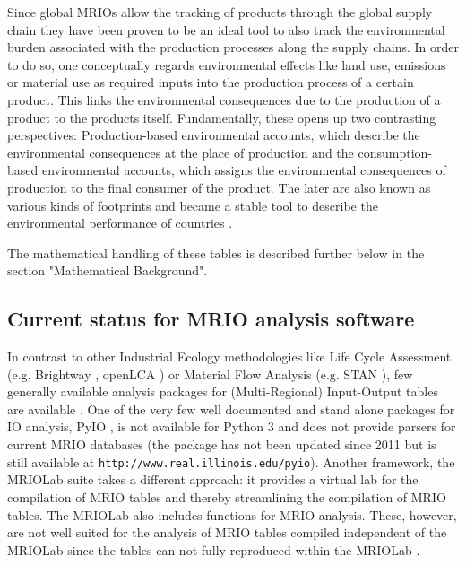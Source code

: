 \documentclass{jors}
\begin{document}
{Since global MRIOs allow the tracking of products through the global supply chain they have been proven to be an ideal tool to also track the environmental burden associated with the production processes along the supply chains. 
In order to do so, one conceptually regards environmental effects like land use, emissions or material use as required inputs into the production process of a certain product. 
This links the environmental consequences due to the production of a product to the products itself. 
Fundamentally, these opens up two contrasting perspectives: Production-based environmental accounts, which describe the environmental consequences at the place of production and the consumption-based environmental accounts, which assigns the environmental consequences of production to the final consumer of the product. 
The later are also known as various kinds of footprints and became a stable tool to describe the environmental performance of countries \cite{tukker2014_Global, ivanova2017_Mapping, giljum2016_Identifying}.

The mathematical handling of these tables is described further below in the section "Mathematical Background".


\subsection*{Current status for MRIO analysis software}

In contrast to other Industrial Ecology methodologies like 
Life Cycle Assessment (e.g. Brightway \cite{mutel2017_Brightway}, openLCA \cite{openlca2018_openLCA})
or Material Flow Analysis (e.g. STAN \cite{cencic2008_Material}), 
few generally available analysis packages for (Multi-Regional) Input-Output tables are available \cite{pauliuk2015_Lifting}. One of the very few well documented and stand alone packages for IO analysis, PyIO \cite{nazara2003_PyIO}, is not available for Python 3 and does not provide parsers for current MRIO databases (the package has not been updated since 2011 but is still available at \texttt{http://www.real.illinois.edu/pyio}). Another framework, the MRIOLab suite \cite{lenzen2017_Global, geschke2017_Virtual} takes a different approach: it provides a virtual lab for the compilation of MRIO tables and thereby streamlining the compilation of MRIO tables. The MRIOLab also includes functions for MRIO analysis. These, however, are not well suited for the analysis of MRIO tables compiled independent of the MRIOLab since the tables can not fully reproduced within the MRIOLab \cite{reyes2017_Virtual, rahman2017_flexible}.

}
\end{document}
